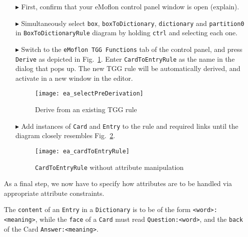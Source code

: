 \begin{enumerate}
  
\item[$\blacktriangleright$] First, confirm that your eMoflon control panel window is open (explain).
  
\item[$\blacktriangleright$] Simultaneously select \texttt{box}, \texttt{boxToDictionary}, \texttt{dictionary} and \texttt{partition0} in
\texttt{Box\-To\-Dictionary\-Rule} diagram by holding \texttt{ctrl} and selecting each one.
  
\item[$\blacktriangleright$] Switch to the \texttt{eMoflon TGG Functions} tab of the control panel, and press \texttt{Derive} as depicted in
Fig.~\ref{fig:derive_from_tgg_rule}. Enter  \texttt{CardToEntryRule} as the name in the dialog that pops up. The new TGG rule will be automatically derived, and
activate in a new window in the editor. 

\vspace{0.5cm}

\begin{figure}[htbp]
\begin{center}
 \texttt{[image: ea\_selectPreDerivation]}
  \caption{Derive from an existing TGG rule}
  \label{fig:derive_from_tgg_rule}
\end{center}
\end{figure}
\FloatBarrier

\item[$\blacktriangleright$] Add instances of \texttt{Card} and \texttt{Entry} to the rule and required links until the diagram closely resembles
Fig.~\ref{fig:cardtoentry_1}.

  \begin{figure}[htbp]
  \begin{center}
    \texttt{[image: ea\_cardToEntryRule]}
    \caption{\texttt{CardToEntryRule} without attribute manipulation}
    \label{fig:cardtoentry_1}
  \end{center}
  \end{figure}

\end{enumerate}

As a final step, we now have to specify how attributes are to be handled via appropriate attribute constraints.

The \texttt{content} of an \texttt{Entry} in a \texttt{Dictionary} is to be of the form \texttt{<word>:<meaning>}, while the \texttt{face} of a \texttt{Card}
must read \texttt{Question:<word>}, and the \texttt{back} of the Card \texttt{Answer:<meaning>}.

